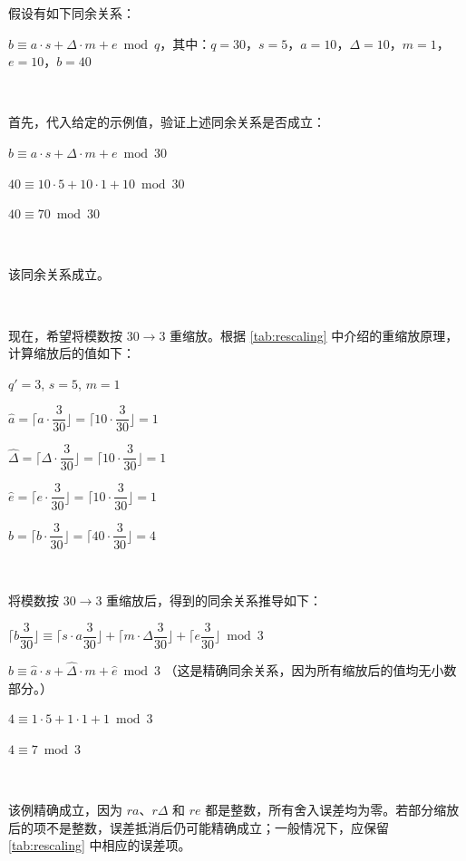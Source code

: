 假设有如下同余关系：

$b \equiv a\cdot s + \Delta \cdot m + e \bmod q$，\text{ }其中：$q = 30$，\text{ }$s = 5$，\text{ }$a = 10$，\text{ }$\Delta = 10$，\text{ }$m = 1$，\text{ }$e = 10$，\text{ }$b = 40$

$ $

首先，代入给定的示例值，验证上述同余关系是否成立：

$b \equiv a\cdot s + \Delta \cdot m + e \bmod 30$

$40 \equiv 10 \cdot 5 + 10 \cdot 1 + 10 \bmod 30$

$40 \equiv 70 \bmod 30$ 

$ $

该同余关系成立。

$ $

现在，希望将模数按 $30 \rightarrow 3$ 重缩放。根据 \autoref{tab:rescaling} 中介绍的重缩放原理，计算缩放后的值如下：

$q'= 3$, \text{ } $s = 5$, \text{ } $m = 1$

$\hat{a} = \Bigg\lceil a\cdot\dfrac{3}{30} \Bigg\rfloor = \Bigg\lceil 10\cdot\dfrac{3}{30} \Bigg\rfloor = 1$

$\hat{\Delta} = \Bigg\lceil \Delta\cdot\dfrac{3}{30} \Bigg\rfloor = \Bigg\lceil 10\cdot\dfrac{3}{30} \Bigg\rfloor = 1$



$\hat{e} = \Bigg\lceil e\cdot\dfrac{3}{30} \Bigg\rfloor = \Bigg\lceil 10\cdot\dfrac{3}{30} \Bigg\rfloor = 1$

$\hat{b} = \Bigg\lceil b\cdot\dfrac{3}{30} \Bigg\rfloor = \Bigg\lceil 40\cdot\dfrac{3}{30} \Bigg\rfloor = 4$

$ $

将模数按 $30 \rightarrow 3$ 重缩放后，得到的同余关系推导如下：

$\Bigg\lceil b\dfrac{3}{30} \Bigg\rfloor \equiv \Bigg\lceil s\cdot a \dfrac{3}{30} \Bigg\rfloor + \Bigg\lceil m \cdot \Delta \dfrac{3}{30} \Bigg\rfloor + \Bigg\lceil e \dfrac{3}{30} \Bigg\rfloor \bmod 3$

$\hat{b} \equiv \hat{a} \cdot s + \hat{\Delta} \cdot m + \hat{e}  \bmod 3$
 \text{ }（这是精确同余关系，因为所有缩放后的值均无小数部分。）

$4 \equiv 1 \cdot 5 + 1 \cdot 1 + 1 \bmod 3$

$4 \equiv 7 \bmod 3$

$ $

该例精确成立，因为 $ra$、$r\Delta$ 和 $re$ 都是整数，所有舍入误差均为零。若部分缩放后的项不是整数，误差抵消后仍可能精确成立；一般情况下，应保留 \autoref{tab:rescaling} 中相应的误差项。









